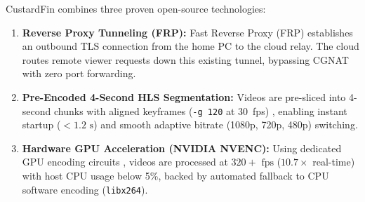 CustardFin combines three proven open-source technologies:
\begin{enumerate}
    \item \textbf{Reverse Proxy Tunneling (FRP):} Fast Reverse Proxy (FRP) \cite{fatedier2024frp} establishes an outbound TLS connection from the home PC to the cloud relay. The cloud routes remote viewer requests down this existing tunnel, bypassing CGNAT with zero port forwarding.
    \item \textbf{Pre-Encoded 4-Second HLS Segmentation:} Videos are pre-sliced into 4-second chunks with aligned keyframes (\texttt{-g 120} at 30~fps) \cite{pantos2017http}, enabling instant startup ($<1.2\text{ s}$) and smooth adaptive bitrate (1080p, 720p, 480p) switching.
    \item \textbf{Hardware GPU Acceleration (NVIDIA NVENC):} Using dedicated GPU encoding circuits \cite{nvidia2023nvenc}, videos are processed at $320+\text{ fps}$ ($10.7\times$ real-time) with host CPU usage below 5\%, backed by automated fallback to CPU software encoding (\texttt{libx264}).
\end{enumerate}
